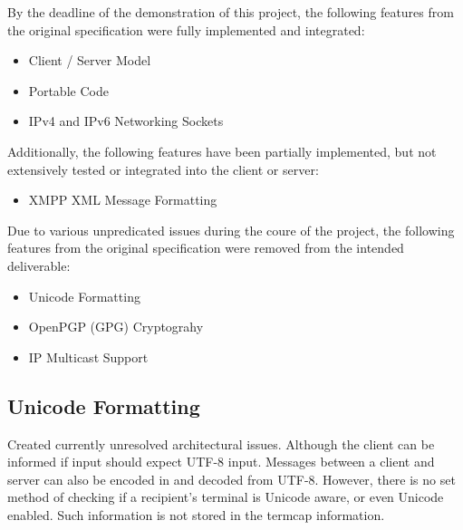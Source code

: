 
By the deadline of the demonstration of this project, the following
features from the original specification were fully implemented and
integrated:

\begin{itemize}

\item Client / Server Model

\item Portable Code

\item IPv4 and IPv6 Networking Sockets

\end{itemize}

Additionally, the following features have been partially implemented,
but not extensively tested or integrated into the client or server:

\begin{itemize}

\item XMPP XML Message Formatting

\end{itemize}


Due to various unpredicated issues during the coure of the project, the
following features from the original specification were removed from the
intended deliverable:

\begin{itemize}

\item Unicode Formatting

\item OpenPGP (GPG) Cryptograhy

\item IP Multicast Support

\end{itemize}


\subsection{Unicode Formatting}

Created currently unresolved architectural issues. Although
the client can be informed if input should expect UTF-8 input. 
Messages between a client and server can also be encoded in and
decoded from UTF-8. However, there is no set method of checking if a
recipient's terminal is Unicode aware, or even Unicode enabled. Such
information is not stored in the termcap information.

